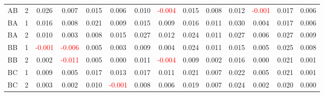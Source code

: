 \begin{table}[H]
{\begin{tabular}{llcccccccccccc}
AB & 2 & 0.026 & 0.007 & 0.015 & 0.006 & 0.010 & \textcolor{red}{-0.004} & 0.015 & 0.008 & 0.012 & \textcolor{red}{-0.001} & 0.017 & 0.006\\
BA & 1 & 0.016 & 0.008 & 0.021 & 0.009 & 0.015 & 0.009 & 0.016 & 0.011 & 0.030 & 0.004 & 0.017 & 0.006\\
BA & 2 & 0.010 & 0.003 & 0.008 & 0.015 & 0.027 & 0.012 & 0.024 & 0.011 & 0.027 & 0.006 & 0.027 & 0.009\\
BB & 1 & \textcolor{red}{-0.001} & \textcolor{red}{-0.006} & 0.005 & 0.003 & 0.009 & 0.004 & 0.024 & 0.011 & 0.015 & 0.005 & 0.025 & 0.008\\
BB & 2 & 0.002 & \textcolor{red}{-0.011} & 0.005 & 0.000 & 0.011 & \textcolor{red}{-0.004} & 0.009 & 0.002 & 0.016 & 0.000 & 0.021 & 0.001\\
BC & 1 & 0.009 & 0.005 & 0.017 & 0.013 & 0.017 & 0.011 & 0.021 & 0.007 & 0.022 & 0.005 & 0.021 & 0.001\\
BC & 2 & 0.003 & 0.002 & 0.010 & \textcolor{red}{-0.001} & 0.008 & 0.006 & 0.019 & 0.007 & 0.024 & 0.002 & 0.020 & 0.000\\
\hline
    \end{tabular}%
    }
    \label{tab:cen9_sh}
\end{table}
